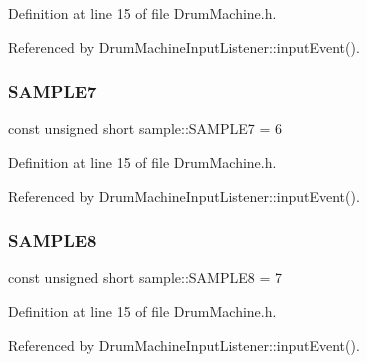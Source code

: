 Definition at line 15 of file Drum\+Machine.\+h.



Referenced by Drum\+Machine\+Input\+Listener\+::input\+Event().

\mbox{\label{namespacesample_ad35669bc942fa6aa53d1d261f7257a3e}} 
\subsubsection{\texorpdfstring{S\+A\+M\+P\+L\+E7}{SAMPLE7}}
{\footnotesize\ttfamily const unsigned short sample\+::\+S\+A\+M\+P\+L\+E7 = 6}



Definition at line 15 of file Drum\+Machine.\+h.



Referenced by Drum\+Machine\+Input\+Listener\+::input\+Event().

\mbox{\label{namespacesample_a941e99fc5405e8c43f53d75c486d0819}} 
\subsubsection{\texorpdfstring{S\+A\+M\+P\+L\+E8}{SAMPLE8}}
{\footnotesize\ttfamily const unsigned short sample\+::\+S\+A\+M\+P\+L\+E8 = 7}



Definition at line 15 of file Drum\+Machine.\+h.



Referenced by Drum\+Machine\+Input\+Listener\+::input\+Event().

